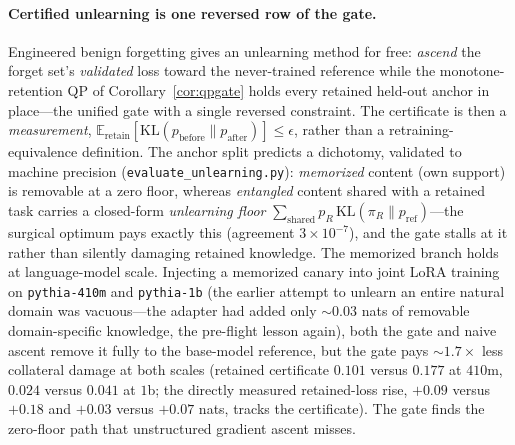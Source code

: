 \documentclass[10pt,a4paper]{article}
\theoremstyle{plain}
\theoremstyle{definition}
\begin{document}
\paragraph{Certified unlearning is one reversed row of the gate.} Engineered benign
forgetting gives an unlearning method for free: \emph{ascend} the forget set's
\emph{validated} loss toward the never-trained reference while the monotone-retention
QP of Corollary~\ref{cor:qpgate} holds every retained held-out anchor in place---the
unified gate with a single reversed constraint. The certificate is then a
\emph{measurement}, $\mathbb{E}_{\mathrm{retain}}[\mathrm{KL}(p_{\mathrm{before}}\|
p_{\mathrm{after}})]\le\epsilon$, rather than a retraining-equivalence definition. The
anchor split predicts a dichotomy, validated to machine precision
(\texttt{evaluate\_unlearning.py}): \emph{memorized} content (own support) is removable
at a zero floor, whereas \emph{entangled} content shared with a retained task carries a
closed-form \emph{unlearning floor} $\sum_{\mathrm{shared}}p_R\,\mathrm{KL}(\pi_R\|
p_{\mathrm{ref}})$---the surgical optimum pays exactly this (agreement $3\times10^{-7}$),
and the gate stalls at it rather than silently damaging retained knowledge. The
memorized branch holds at language-model scale. Injecting a memorized canary into joint
LoRA training on \texttt{pythia-410m} and \texttt{pythia-1b} (the earlier attempt to
unlearn an entire natural domain was vacuous---the adapter had added only $\sim0.03$
nats of removable domain-specific knowledge, the pre-flight lesson again), both the gate
and naive ascent remove it fully to the base-model reference, but the gate pays $\sim
1.7\times$ less collateral damage at both scales (retained certificate $0.101$ versus
$0.177$ at $410$m, $0.024$ versus $0.041$ at $1$b; the directly measured retained-loss
rise, $+0.09$ versus $+0.18$ and $+0.03$ versus $+0.07$ nats, tracks the certificate).
The gate finds the zero-floor path that unstructured gradient ascent misses.
\end{document}
